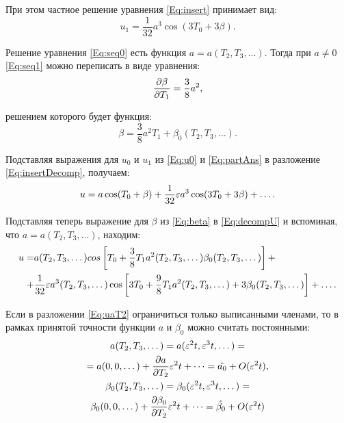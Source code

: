 При этом частное решение уравнения \eqref{Eq:insert} принимает вид:
\begin{equation} \label{Eq:partAns}
    u_1 = \frac{1}{32} a^3 \cos(3 T_0 + 3 \beta). 
\end{equation}

Решение уравнения \eqref{Eq:seq0} есть функция
$a = a(T_2, T_3, \dots)$.
Тогда при $a \ne 0$ \eqref{Eq:seq1} можно переписать в виде уравнения:
\begin{equation*}
    \pdv{\beta}{T_1} = \frac{3}{8} a^2, 
\end{equation*}

решением которого будет функция:
\begin{equation} \label{Eq:beta}
    \beta = \frac{3}{8} a^2 T_1 + \beta_0(T_2, T_3, \dots). 
\end{equation}

Подставляя выражения для $u_0$ и $u_1$ из \eqref{Eq:u0}
и \eqref{Eq:partAns} в разложение \eqref{Eq:insertDecomp}, получаем:
\begin{equation} \label{Eq:decompU}
    u = a \cos(T_0 + \beta) + \frac{1}{32} \varepsilon a^3 \cos(3 T_0 + 3 \beta) + \dots. 
\end{equation}

Подставляя теперь выражение для $\beta$ из \eqref{Eq:beta} в \eqref{Eq:decompU}
и вспоминая, что $a = a(T_2, T_3, \dots)$, находим:
\begin{align}
    u = & a(T_2, T_3, \dots) cos\left[ T_0 +
    \frac{3}{8} T_1 a^2(T_2, T_3, \dots)
    \beta_0(T_2, T_3, \dots) \right] + \nonumber \\
    + & \frac{1}{32} \varepsilon a^3(T_2, T_3, \dots) \cos\left[ 3 T_0 + 
    \frac{9}{8} T_1 a^2(T_2, T_3, \dots) +
    3 \beta_0(T_2, T_3, \dots) \right] + \dots.  \label{Eq:uaT2}
\end{align}

Если в разложении \eqref{Eq:uaT2} ограничиться только выписанными членами,
то в рамках принятой точности функции $a$ и $\beta_0$ можно считать постоянными:
\begin{equation*}
    \begin{gathered}
        a(T_2, T_3, \dots) = a(\varepsilon^2 t, \varepsilon^3 t, \dots) = \\
        = a(0, 0, \dots) + \pdv{a}{T_2} \varepsilon^2 t + \dots = \hat{a_0} + O(\varepsilon^2 t), \\
        \beta_0(T_2, T_3, \dots) = \beta_0(\varepsilon^2 t, \varepsilon^3 t, \dots) = \\
        \beta_0(0, 0, \dots) + \pdv{\beta_0}{T_2} \varepsilon^2 t + \dots =
        \hat{\beta_0} + O(\varepsilon^2 t)
    \end{gathered}
\end{equation*}

